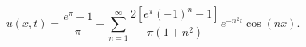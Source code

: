 \[u(x,t)=\frac{e^\pi-1}{\pi}+\sum_{n=1}^{\infty}\frac{2[e^\pi(-1)^n-1]}{\pi(1+n^2)}e^{-n^2t}\cos(nx).\]
